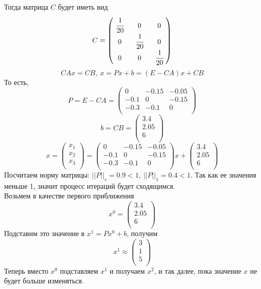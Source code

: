 \documentclass[12pt]{article}
\theoremstyle{definition}
\numberwithin{equation}{section}
\begin{document}
Тогда матрица $C$ будет иметь вид
\[C=\begin{pmatrix}
~\cfrac{1}{20}~ & 0 & 0\\
0 & ~\cfrac{1}{20}~ & 0\\
0 & 0 & ~\cfrac{1}{20}~\\
\end{pmatrix}\]
$$CAx=CB,~x=Px+b=(E-CA)x+CB$$
То есть,  
\[P=E-CA=\begin{pmatrix}
0 & -0.15 & -0.05\\
-0.1 & 0 & -0.15\\
-0.3 & -0.1 & 0\\
\end{pmatrix}\]
\[b=CB=\begin{pmatrix}
3.4\\
2.05\\
6\\
\end{pmatrix}\]
\[x=\begin{pmatrix}
x_1\\
x_2\\
x_3\\
\end{pmatrix} = \begin{pmatrix}
0 & -0.15 & -0.05\\
-0.1 & 0 & -0.15\\
-0.3 & -0.1 & 0\\
\end{pmatrix}x + \begin{pmatrix}
3.4\\
2.05\\
6\\
\end{pmatrix}\]
Посчитаем норму матрицы: $||P||_c=0.9<1,~||P||_1=0.4<1$. Так как ее значения меньше 1, значит процесс итераций будет сходящимся.\\
Возьмем в качестве первого приближения 
\[x^0=\begin{pmatrix}
3.4\\
2.05\\
6\\
\end{pmatrix}\]
Подставим это значение в $x^1=Px^0+b$, получим 
\[x^1 \approx \begin{pmatrix}
3\\
1\\
5\\
\end{pmatrix}\]
Теперь вместо $x^0$ подставляем $x^1$ и получаем $x^2$, и так далее, пока значение $x$ не будет больше изменяться.\\ \\
\end{document}
